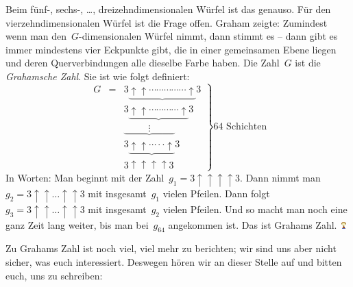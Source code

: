 \documentclass{../../zirkelblatt1718}
\theoremstyle{definition}
\theoremstyle{plain}
\theoremstyle{remark}
\newcommand{\happy}{\includegraphics[height=0.7em]{happy}\xspace}
\begin{document}
Beim fünf-, sechs-, \ldots, dreizehndimensionalen Würfel ist das genauso. Für
den vierzehndimensionalen Würfel ist die Frage offen. Graham zeigte: Zumindest
wenn man den~$G$-dimensionalen Würfel nimmt, dann stimmt es -- dann gibt es
immer mindestens vier Eckpunkte gibt, die in einer gemeinsamen Ebene liegen und
deren Querverbindungen alle dieselbe Farbe haben. Die Zahl~$G$ ist die
\emph{Grahamsche Zahl}. Sie ist wie folgt definiert:
\[
\left.
 \begin{matrix}
  G &=&3\underbrace{\uparrow \uparrow \cdots\cdots\cdots\cdots\cdots \uparrow}3 \\
    & &3\underbrace{\uparrow \uparrow \cdots\cdots\cdots\cdots \uparrow}3 \\
    & &\underbrace{\qquad\;\; \vdots \qquad\;\;} \\
    & &3\underbrace{\uparrow \uparrow \cdots\cdot\cdot \uparrow}3 \\
    & &3\uparrow \uparrow \uparrow \uparrow3
 \end{matrix}
\right \} \text{64 Schichten}
\]
In Worten: Man beginnt mit der Zahl~$g_1 = 3\uparrow \uparrow \uparrow \uparrow3$.
Dann nimmt man~$g_2 = 3 \uparrow \uparrow \ldots \uparrow \uparrow 3$ mit
insgesamt~$g_1$ vielen Pfeilen. Dann folgt~$g_3 = 3 \uparrow \uparrow \ldots
\uparrow \uparrow 3$ mit insgesamt~$g_2$ vielen Pfeilen. Und so macht man noch
eine ganz Zeit lang weiter, bis man bei~$g_{64}$ angekommen ist. Das ist
Grahams Zahl.~\happy

Zu Grahams Zahl ist noch viel, viel mehr zu berichten; wir sind uns aber nicht
sicher, was euch interessiert. Deswegen hören wir an dieser Stelle auf und
bitten euch, uns zu schreiben:
\end{document}
